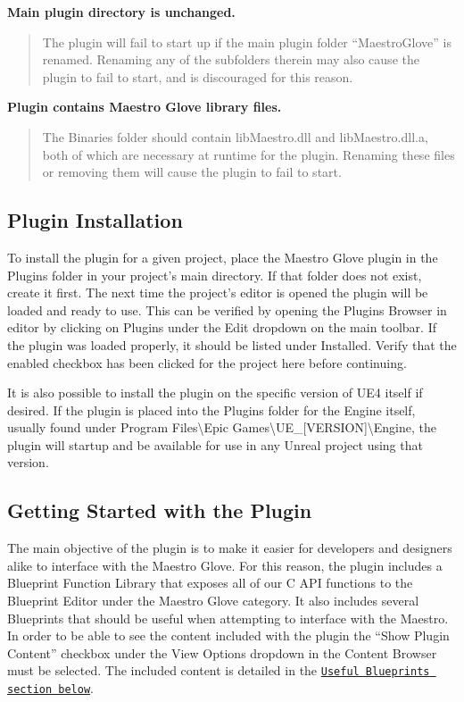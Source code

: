 \begin{DoxyItemize}
\item {\bfseries Main plugin directory is unchanged.} \begin{quote}
The plugin will fail to start up if the main plugin folder “\+Maestro\+Glove” is renamed. Renaming any of the subfolders therein may also cause the plugin to fail to start, and is discouraged for this reason. \end{quote}

\item {\bfseries Plugin contains Maestro Glove library files.} \begin{quote}
The Binaries folder should contain {\ttfamily lib\+Maestro.\+dll} and {\ttfamily lib\+Maestro.\+dll.\+a}, both of which are necessary at runtime for the plugin. Renaming these files or removing them will cause the plugin to fail to start. \end{quote}

\end{DoxyItemize}

\subsection*{Plugin Installation}

To install the plugin for a given project, place the Maestro Glove plugin in the {\ttfamily Plugins} folder in your project’s main directory. If that folder does not exist, create it first. The next time the project’s editor is opened the plugin will be loaded and ready to use. This can be verified by opening the Plugins Browser in editor by clicking on Plugins under the Edit dropdown on the main toolbar. If the plugin was loaded properly, it should be listed under Installed. Verify that the enabled checkbox has been clicked for the project here before continuing.

It is also possible to install the plugin on the specific version of U\+E4 itself if desired. If the plugin is placed into the {\ttfamily Plugins} folder for the Engine itself, usually found under {\ttfamily Program Files\textbackslash{}Epic Games\textbackslash{}U\+E\+\_\+\mbox{[}V\+E\+R\+S\+I\+ON\mbox{]}\textbackslash{}Engine}, the plugin will startup and be available for use in any Unreal project using that version.

\subsection*{Getting Started with the Plugin}

The main objective of the plugin is to make it easier for developers and designers alike to interface with the Maestro Glove. For this reason, the plugin includes a Blueprint Function Library that exposes all of our C A\+PI functions to the Blueprint Editor under the Maestro Glove category. It also includes several Blueprints that should be useful when attempting to interface with the Maestro. In order to be able to see the content included with the plugin the “\+Show Plugin Content” checkbox under the View Options dropdown in the Content Browser must be selected. The included content is detailed in the \href{#useful-blueprints}{\tt Useful Blueprints section below}.

